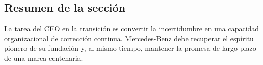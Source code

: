 \subsection{Resumen de la sección}

La tarea del CEO en la transición es convertir la incertidumbre en una capacidad organizacional de corrección continua. Mercedes-Benz debe recuperar el espíritu pionero de su fundación y, al mismo tiempo, mantener la promesa de largo plazo de una marca centenaria.
